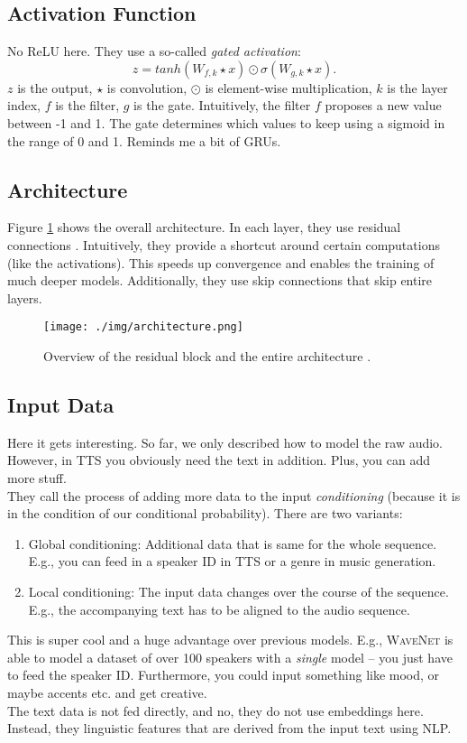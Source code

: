 \subsection{Activation Function}
\label{sec:activation-function}
No ReLU here. They use a so-called \textit{gated activation}:
\[
	z = tanh(W_{f,k} \star x) \odot \sigma(W_{g,k} \star x).
\]
$z$ is the output, $\star$ is convolution, $\odot$ is element-wise multiplication, $k$ is the layer index, $f$ is the filter, $g$ is the gate. Intuitively, the filter $f$ proposes a new value between -1 and 1. The gate determines which values to keep using a sigmoid in the range of 0 and 1. Reminds me a bit of GRUs.

\subsection{Architecture}
\label{sec:architecure}
Figure \ref{fig:architecture} shows the overall architecture. In each layer, they use residual connections \parencite{he_deep_2016}. Intuitively, they provide a shortcut around certain computations (like the activations). This speeds up convergence and enables the training of much deeper models. Additionally, they use skip connections that skip entire layers.

\begin{figure}[h]
	\centering
		\texttt{[image: ./img/architecture.png]}
	\caption{Overview of the residual block and the entire architecture \parencite{oord_wavenet:_2016}.}
	\label{fig:architecture}
\end{figure}

\subsection{Input Data}
\label{sec:input-data}
Here it gets interesting. So far, we only described how to model the raw audio. However, in TTS you obviously need the text in addition. Plus, you can add more stuff.\\
They call the process of adding more data to the input \textit{conditioning} (because it is in the condition of our conditional probability). There are two variants:
\begin{enumerate}
	\item Global conditioning: Additional data that is same for the whole sequence. E.g., you can feed in a speaker ID in TTS or a genre in music generation.
	\item Local conditioning: The input data changes over the course of the sequence. E.g., the accompanying text has to be aligned to the audio sequence.
\end{enumerate}
This is super cool and a huge advantage over previous models. E.g., \textsc{WaveNet} is able to model a dataset of over 100 speakers with a \textit{single} model -- you just have to feed the speaker ID. Furthermore, you could input something like mood, or maybe accents etc. and get creative.\\
The text data is not fed directly, and no, they do not use embeddings here. Instead, they linguistic features that are derived from the input text using NLP.

